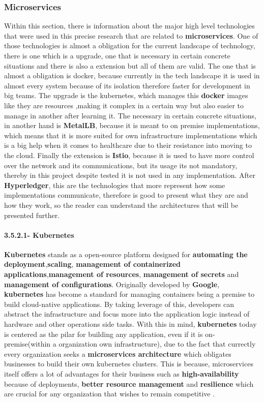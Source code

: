 \subsubsection{Microservices}
Within this section, there is information about the major high level technologies that were used in this precise research that are related to \textbf{microservices}. One of those technologies is almost a obligation for the current landscape of technology, there is one  which is a upgrade, one that is necessary in certain concrete situations and there is also a extension but all of them are valid. The one that is almost a obligation is docker, because currently in the tech landscape it is used in almost every system because of its isolation therefore faster for development in big teams. The upgrade is the kubernetes, which manages this \textbf{docker} images like they are resources ,making it complex in a certain way but also easier to manage in another after learning it. The necessary in certain concrete situations, in another hand is \textbf{MetalLB}, because it is meant to on premise implementations, which means that it is more suited for own infrastructure implementations which is a big help when it comes to healthcare due to their resistance into moving to the cloud. Finally the extension is \textbf{Istio}, because it is used to have more control over the network and its communications, but its usage its not mandatory, thereby in this project despite tested it is not used in any implementation.
After \textbf{Hyperledger}, this are the technologies that more represent how some implementations communicate, therefore is good to present what they are and how they work, so the reader can understand the architectures that will be presented further. 

\paragraph{3.5.2.1- Kubernetes}\mbox{}

\textbf{Kubernetes} stands as a open-source platform designed for \textbf{automating the deployment},\textbf{scaling}, \textbf{management of containerized applications},\textbf{management of resources}, \textbf{management of secrets} and \textbf{management of configurations}. Originally developed by \textbf{Google}, \textbf{kubernetes} has become a standard for managing containers being a premise to build cloud-native applications. By taking leverage of this, developers can abstract the infrastructure and focus more into the application logic instead of hardware and other operations side tasks. With this in mind, \textbf{kubernetes} today is centered as the pilar for building any application, even if it is on-premise(within a organization own infrastructure), due to the fact that currectly every organization seeks a \textbf{microservices architecture} which obligates businesses to build their own kubernetes clusters. This is because, microservices itself offers a lot of advantages for their business such as \textbf{high-availability} because of deployments, \textbf{better resource management} and \textbf{resilience} which are crucial for any organization that wishes to remain competitive \cite{kubernetes}. 

